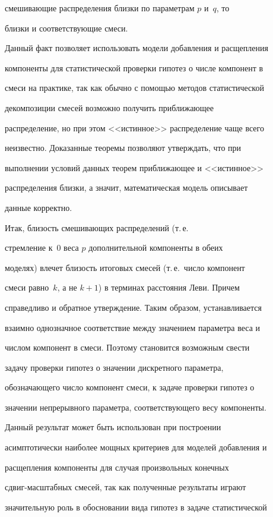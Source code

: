смешивающие распределения близки по параметрам $p$ и~$q$, то

близки и соответствующие смеси.



Данный факт позволяет использовать модели добавления и расщепления

компоненты для статистической проверки гипотез о числе компонент в

смеси на практике, так как обычно с помощью методов статистической

декомпозиции смесей возможно получить приближающее

распределение, но при этом <<истинное>> распределение чаще всего

неизвестно. Доказанные теоремы позволяют утверждать, что при

выполнении условий данных теорем приближающее и <<истинное>>

распределения близки, а значит, математическая модель описывает

данные корректно.



Итак, близость смешивающих распределений (т.\,е.\ 

стремление к~0 веса $p$ дополнительной компоненты в обеих

моделях) влечет близость итоговых смесей (т.\,е.\ чис\-ло компонент

смеси равно~$k$, а не $k+1$) в терминах расстояния Леви. Причем

справедливо и обратное утверждение. Таким образом, устанавливается

взаимно однозначное соответствие между значением параметра веса и

числом компонент в смеси. Поэтому становится возможным свести

задачу проверки гипотез о значении дискретного параметра,

обозначающего число компонент смеси, к задаче проверки гипотез о

значении непрерывного параметра, соответствующего весу компоненты.

Данный результат может быть использован при построении

асимптотически наиболее мощных критериев для моделей добавления и

расщепления компоненты для случая произвольных конечных

сдвиг-мас\-штаб\-ных смесей, так как полученные результаты играют

значительную роль в обосновании вида гипотез в задаче статистической

